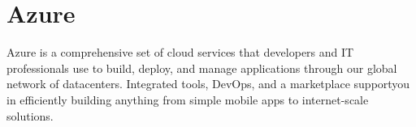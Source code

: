 \section{Azure}
Azure is a comprehensive set of cloud services that developers
and IT professionals use to build, deploy, and manage applications through our
global network of datacenters. Integrated tools, DevOps, and a marketplace
supportyou in efficiently building anything from simple mobile apps to
internet-scale solutions\cite{www-azure}.
